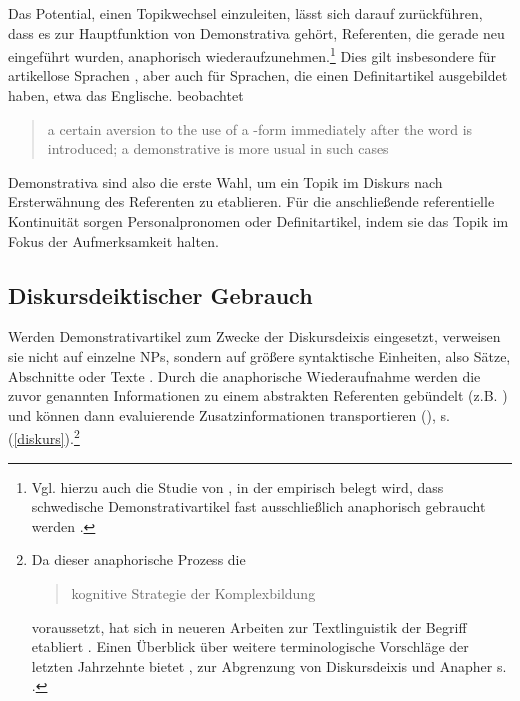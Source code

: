 \begin{exe}
	\ex \label{ex:topic}  
\end{exe}

Das Potential, einen Topikwechsel einzuleiten, lässt sich darauf zurückführen, dass es zur Hauptfunktion von Demonstrativa gehört, Referenten, die gerade neu eingeführt wurden, anaphorisch wiederaufzunehmen.\footnote{Vgl. hierzu auch die Studie von \citeauthor{Fraurud1990}, in der empirisch belegt wird, dass schwedische Demonstrativartikel fast ausschließlich anaphorisch gebraucht werden \parencite[400]{Fraurud1990}.} Dies gilt insbesondere für artikellose Sprachen  \parencite[229]{Himmelmann1996}, aber auch für Sprachen, die einen Definitartikel ausgebildet haben, etwa das Englische. \citeauthor{Christophersen1939} beobachtet \blockcquote[vgl.][29]{Christophersen1939} {a certain aversion to the use of a -form immediately after the word is introduced; a demonstrative is more usual in such cases}. Demonstrativa sind also die erste Wahl, um ein Topik im Diskurs nach Ersterwähnung des Referenten zu etablieren. Für die  anschließende referentielle Kontinuität sorgen  Personalpronomen oder Definitartikel, indem sie das Topik im Fokus der Aufmerksamkeit halten. 

\subsection{Diskursdeiktischer Gebrauch}\label{diskurs-deikt}

Werden Demonstrativartikel zum Zwecke der Diskursdeixis eingesetzt, verweisen sie nicht auf einzelne NPs, sondern auf größere syntaktische Einheiten, also Sätze, Abschnitte oder Texte \parencite{Webber1991,Fraurud1992, Fillmore1997, Diessel1999, Consten2007, Consten2009, Marx2011}. Durch die anaphorische Wiederaufnahme werden die zuvor genannten Informationen zu einem abstrakten Referenten gebündelt (z.B. ) und können dann evaluierende Zusatzinformationen transportieren (),  s. (\ref{diskurs}).\footnote{Da dieser anaphorische Prozess die \blockcquote[129]{Schwarz2000}{kognitive Strategie der Komplexbildung} voraussetzt, hat sich in neueren Arbeiten zur Textlinguistik der Begriff  etabliert \parencite[s. z.b.][]{Consten2007, Consten2009}. Einen Überblick über weitere terminologische Vorschläge der letzten Jahrzehnte bietet \textcite[16-17]{Marx2011}, zur Abgrenzung von Diskursdeixis und Anapher s. \textcite[30-31]{Consten2004}.} 

